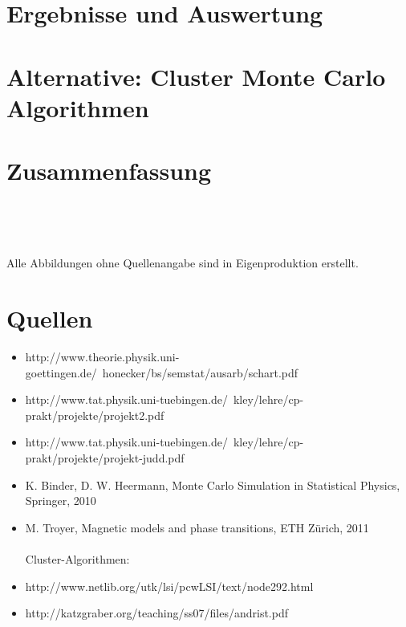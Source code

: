 \documentclass[12pt,a4paper, german]{article}
\begin{document}
\section{Ergebnisse und Auswertung}

\newpage
\section{Alternative: Cluster Monte Carlo Algorithmen}

\newpage
\section{Zusammenfassung}

\newpage
\listoffigures

\

\

Alle Abbildungen ohne Quellenangabe sind in Eigenproduktion erstellt.


\section*{Quellen}
\begin{itemize}
\item http://www.theorie.physik.uni-goettingen.de/~honecker/bs/semstat/ausarb/schart.pdf
\item http://www.tat.physik.uni-tuebingen.de/~kley/lehre/cp-prakt/projekte/projekt2.pdf
\item http://www.tat.physik.uni-tuebingen.de/~kley/lehre/cp-prakt/projekte/projekt-judd.pdf
\item K. Binder, D. W. Heermann, Monte Carlo Simulation in Statistical Physics, Springer, 2010
\item M. Troyer, Magnetic models and phase transitions, ETH Zürich, 2011\\\\
Cluster-Algorithmen:
\item http://www.netlib.org/utk/lsi/pcwLSI/text/node292.html
\item http://katzgraber.org/teaching/ss07/files/andrist.pdf
\end{itemize}
\newpage
\end{document}
